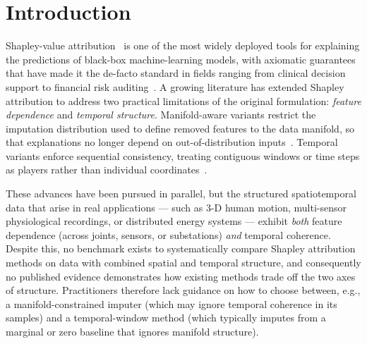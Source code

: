 \section{Introduction}
\label{sec:intro}

Shapley-value attribution~\citep{shapley1953value, lundberg2017unified} is
one of the most widely deployed tools for explaining the predictions of
black-box machine-learning models, with axiomatic guarantees that have made
it the de-facto standard in fields ranging from clinical decision support
to financial risk
auditing~\citep{arrieta2020explainable, slack2020fooling}.
A growing literature has extended Shapley attribution to address two
practical limitations of the original formulation: \emph{feature dependence}
and \emph{temporal structure}.  Manifold-aware variants restrict the imputation
distribution used to define removed features to the data manifold, so that
explanations no longer depend on out-of-distribution
inputs~\citep{frye2021shapley, aas2021explaining, olsen2022using,
taufiq2023manifold, zhang2026axiomatic}.  Temporal variants enforce
sequential consistency, treating contiguous windows or time steps as
players rather than individual coordinates~\citep{bento2021timeshap,
nayebi2023windowshap, villani2022feature, de2025shats}.

These advances have been pursued in parallel, but the structured spatiotemporal
data that arise in real applications --- such as 3-D human motion, multi-sensor
physiological recordings, or distributed energy systems --- exhibit \emph{both}
feature dependence (across joints, sensors, or substations) \emph{and}
temporal coherence.  Despite this, no benchmark exists to systematically compare
Shapley attribution methods on data with combined spatial and temporal structure,
and consequently no published evidence demonstrates how existing methods trade
off the two axes of structure.  Practitioners therefore lack guidance on
how to choose between, e.g., a manifold-constrained imputer (which may ignore
temporal coherence in its samples) and a temporal-window method (which typically
imputes from a marginal or zero baseline that ignores manifold structure).

